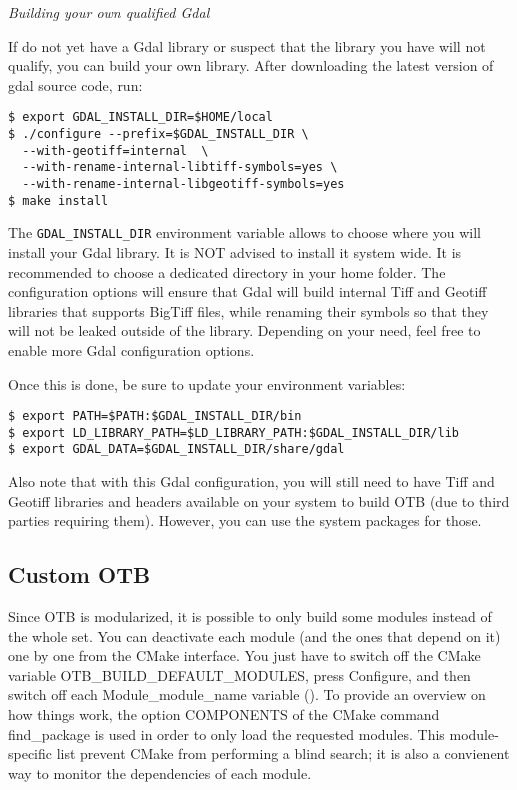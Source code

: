 \emph{Building your own qualified Gdal}

If do not yet have a Gdal library or suspect that the library you have will not qualify, you can build your own library. After downloading the latest version of gdal source code, run:

\begin{verbatim}
$ export GDAL_INSTALL_DIR=$HOME/local
$ ./configure --prefix=$GDAL_INSTALL_DIR \
  --with-geotiff=internal  \
  --with-rename-internal-libtiff-symbols=yes \
  --with-rename-internal-libgeotiff-symbols=yes
$ make install
\end{verbatim}

The \texttt{GDAL\_INSTALL\_DIR} environment variable allows to choose where you will install your Gdal library. It is NOT advised to install it system wide. It is recommended to choose a dedicated directory in your home folder. The configuration options will ensure that Gdal will build internal Tiff and Geotiff libraries that supports BigTiff files, while renaming their symbols so that they will not be leaked outside of the library. Depending on your need, feel free to enable more Gdal configuration options.

Once this is done, be sure to update your environment variables:
\begin{verbatim}
$ export PATH=$PATH:$GDAL_INSTALL_DIR/bin
$ export LD_LIBRARY_PATH=$LD_LIBRARY_PATH:$GDAL_INSTALL_DIR/lib
$ export GDAL_DATA=$GDAL_INSTALL_DIR/share/gdal
\end{verbatim}

Also note that with this Gdal configuration, you will still need to have Tiff and Geotiff libraries and headers available on your system to build OTB (due to third parties requiring them). However, you can use the system packages for those.

\subsection{Custom OTB}
Since OTB is modularized, it is possible to only build some modules instead of the whole set. 
You can deactivate each module (and the ones that depend on it) one by one from the CMake interface. 
You just have to switch off the CMake variable OTB\_BUILD\_DEFAULT\_MODULES, press Configure, and then switch off each Module\_module\_name variable (\*).
To provide an overview on how things work, the option COMPONENTS of the CMake command find\_package is used in order to only load the requested modules.
This module-specific list prevent CMake from performing a blind search; it is also a convienent way to monitor the dependencies of each module.

